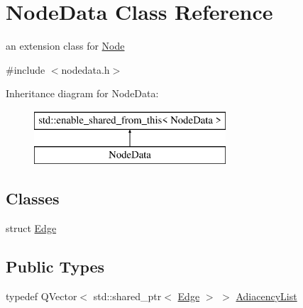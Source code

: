 \hypertarget{class_node_data}{}\section{Node\+Data Class Reference}
\label{class_node_data}


an extension class for \mbox{\hyperlink{class_node}{Node}}  




{\ttfamily \#include $<$nodedata.\+h$>$}

Inheritance diagram for Node\+Data\+:\begin{figure}[H]
\begin{center}
\leavevmode
\includegraphics[height=2.000000cm]{db/d06/class_node_data}
\end{center}
\end{figure}
\subsection*{Classes}
\begin{DoxyCompactItemize}
\item 
struct \mbox{\hyperlink{struct_node_data_1_1_edge}{Edge}}
\end{DoxyCompactItemize}
\subsection*{Public Types}
\begin{DoxyCompactItemize}
\item 
typedef Q\+Vector$<$ std\+::shared\+\_\+ptr$<$ \mbox{\hyperlink{struct_node_data_1_1_edge}{Edge}} $>$ $>$ \mbox{\hyperlink{class_node_data_a18f3494d8d83ab4c6831ea211f4cbf09}{Adiacency\+List}}
\end{DoxyCompactItemize}
